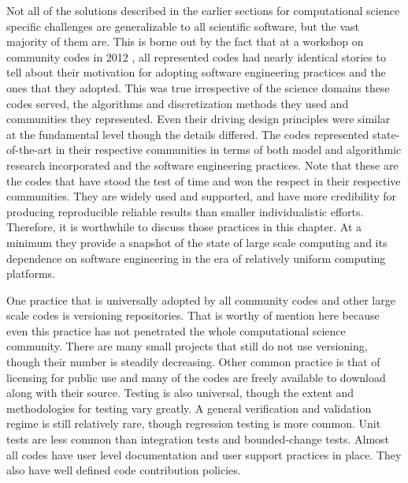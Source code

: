 \label{sec:generalization}

Not all of the solutions described in the earlier sections for
computational science specific challenges are generalizable to all
scientific software, but the vast majority of them are. This is borne
out by the fact that at a workshop on community codes in 2012
\cite{cc2012}, all represented codes had nearly identical stories to
tell about their motivation for adopting software engineering
practices and the ones that they adopted. This was true irrespective
of the science domains these codes served, the algorithms and
discretization methods they used and communities they
represented. Even their driving design principles were similar at the
fundamental level though the details differed. The codes represented
state-of-the-art in their respective communities in terms of both
model and algorithmic research incorporated and the software
engineering practices. Note that these are the codes that have stood
the test of time and won the respect in their respective
communities. They are widely used and supported, and have more
credibility for producing reproducible reliable results than smaller
individualistic efforts. Therefore, it is worthwhile to discuss those
practices in this chapter. At a minimum they provide a snapshot of the
state of large scale computing and its dependence on software
engineering in the era of relatively uniform computing platforms.  

One practice that is universally adopted by all community codes and
other large scale codes is versioning repositories. That is worthy of
mention here because even this practice has not penetrated the whole
computational science community. There are many small projects
that still do not use versioning, though their number is steadily
decreasing. Other common practice is that of licensing for public use
and many of the codes are freely available to download along with their
source. Testing is also universal, though the extent and methodologies
for testing vary greatly. A general verification and validation regime
is still relatively rare, though regression testing is more
common. Unit tests are less common than integration tests and
bounded-change tests. Almost all codes have user level documentation
and user support practices in place. They also have well defined code
contribution policies. 

